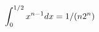 \documentclass[preview]{standalone}
\begin{document}
\begin{align*}
\special{dvisvgm:raw <g id='unique000'>}\int_0^{1/2}x^{n-1}dx=1/(n2^n)\special{dvisvgm:raw </g>}
\end{align*}
\end{document}
